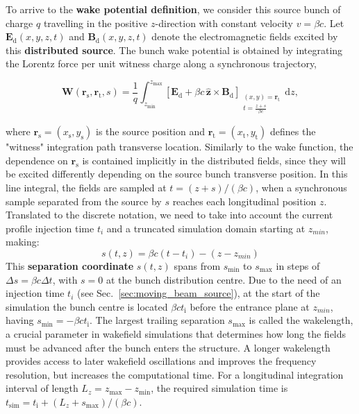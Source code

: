 To arrive to the \textbf{wake potential definition}, we consider this source bunch of charge $q$ travelling in the positive $z$-direction with constant velocity $v=\beta c$. Let $\mathbf{E}_{\mathrm{d}}\left(x,y,z,t\right)$ and $\mathbf{B}_{\mathrm{d}}\left(x,y,z,t\right)$ denote the electromagnetic fields excited by this \textbf{distributed source}. The bunch wake potential is obtained by integrating the Lorentz force per unit witness charge along a synchronous trajectory,

\begin{equation}
\mathbf{W}
\left(
\mathbf{r}_{\mathrm{s}},\mathbf{r}_{\mathrm{t}},s
\right)
=
\frac{1}{q}
\int_{z_{\min}}^{z_{\max}}
\left[
\mathbf{E}_{\mathrm{d}}
+
\beta c\,\widehat{\mathbf{z}}\times\mathbf{B}_{\mathrm{d}}
\right]_{
\substack{
(x,y)=\mathbf{r}_{\mathrm{t}}\\ t=\frac{z+s}{\beta c}}}
\,\mathrm{d}z,
\label{eq:bunch_wake_field_integration}
\end{equation}

where $\mathbf{r}_{\mathrm{s}}=(x_{\mathrm{s}},y_{\mathrm{s}})$ is the source position and $\mathbf{r}_{\mathrm{t}}=(x_{\mathrm{t}},y_{\mathrm{t}})$ defines the "witness" integration path transverse location. Similarly to the wake function, the dependence on $\mathbf{r}_{\mathrm{s}}$ is contained implicitly in the distributed fields, since they will be excited differently depending on the source bunch transverse position. In this line integral, the fields are sampled at $t=(z+s)/(\beta c)$, when a synchronous sample separated from the source by $s$ reaches each longitudinal position $z$. Translated to the discrete notation, we need to take into account the current profile injection time $t_i$ and a truncated simulation domain starting at $z_{min}$, making:
%
\begin{equation}
s(t,z) = \beta c (t-t_i) - (z-z_{min})
\end{equation}
%
This \textbf{separation coordinate} $s(t,z)$ spans from $s_{\min}$ to $s_{\max}$ in steps of $\Delta s=\beta c\Delta t$, with $s=0$ at the bunch distribution centre. Due to the need of an injection time $t_i$ (see Sec.~\ref{sec:moving_beam_source}), at the start of the simulation the bunch centre is located $\beta c t_{\mathrm{i}}$ before the entrance plane at $z_{min}$, having $s_{\min}=-\beta c t_{\mathrm{i}}$. The largest trailing separation $s_{\max}$ is called the \gls{wakelength}, a crucial parameter in wakefield simulations that determines how long the fields must be advanced after the bunch enters the structure. A longer \gls{wakelength} provides access to later wakefield oscillations and improves the frequency resolution, but increases the computational time. For a longitudinal integration interval of length $L_z=z_{\max}-z_{\min}$, the required simulation time is $t_{\mathrm{sim}}=t_{\mathrm{i}}+(L_z+s_{\max})/(\beta c)$.

